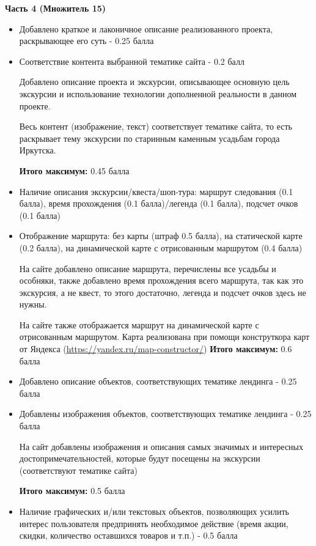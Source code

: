 \textbf{Часть 4 (Множитель 15)}
\begin{itemize}
    \item Добавлено краткое и лаконичное описание реализованного проекта, раскрывающее его суть - 0.25 балла
    \item Соответствие контента выбранной тематике сайта - 0.2 балл
    
    Добавлено описание проекта и экскурсии, описывающее основную цель экскурсии и использование технологии дополненной реальности в данном проекте. 

    Весь контент (изображение, текст) соответствует  тематике сайта, то есть раскрывает тему экскурсии по старинным каменным усадьбам города Иркутска.
    
    \textbf{Итого максимум:} 0.45 балла
    \item Наличие описания экскурсии/квеста/шоп-тура: маршрут следования (0.1 балла), время прохождения (0.1 балла)/легенда (0.1 балла), подсчет очков (0.1 балла)
    \item Отображение маршрута: без карты (штраф 0.5 балла), на статической карте (0.2 балла), на динамической карте с отрисованным маршрутом (0.4 балла)
    
    На сайте добавлено описание маршрута, перечислены все усадьбы и особняки, также добавлено время прохождения всего маршрута, так как это экскурсия, а не квест, то этого достаточно, легенда и подсчет очков здесь не нужны.
    
    На сайте также отображается маршрут на динамической карте с отрисованным маршрутом. Карта реализована при помощи конструткора карт от Яндекса (\url{https://yandex.ru/map-constructor/})
    \textbf{Итого максимум:} 0.6 балла
    
    \item Добавлено описание объектов, соответствующих тематике лендинга  - 0.25 балла
    \item Добавлены изображения объектов, соответствующих тематике лендинга - 0.25 балла
    
    На сайт добавлены изображения и описания самых значимых и интересных достопримечательностей, которые будут посещены на экскурсии (соответствуют тематике сайта) 

    \textbf{Итого максимум:} 0.5 балла
    
    \item Наличие графических и/или текстовых объектов, позволяющих усилить интерес пользователя предпринять необходимое действие (время акции, скидки, количество оставшихся товаров и т.п.) - 0.5 балла
    

\end{itemize}
